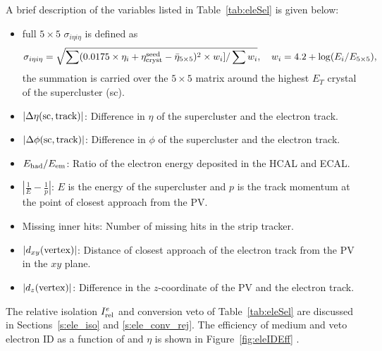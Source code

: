 A brief description of the variables listed in Table~\ref{tab:eleSel} is given below:
\begin{itemize}[leftmargin=*]
    \item full $5\times 5$ $\sigma_{i\eta i\eta}$ is defined as~\cite{Khachatryan:2015hwa} 
    \begin{equation}
    \sigma_{i\eta i\eta}=\sqrt{\sum(0.0175\times\eta_i+\eta^{\rm {seed}}_{\rm {cryst}}-\bar{\eta}_{5\times 5})^2\times w_i]/\sum w_i}, \quad w_i = 4.2 + \log(E_i/E_{5\times 5}),
    \label{eq:sIeIe}
    \end{equation}
    the summation is carried over the $5\times 5$ matrix around the highest $E_T$ crystal of the supercluster (\rm{sc}).
    \item $|\Delta\eta({\rm {sc}},{\rm {track}})|$: Difference in $\eta$ of the supercluster and the electron track.
    \item $|\Delta\phi({\rm {sc}},{\rm {track}})|$: Difference in $\phi$ of the supercluster and the electron track.
    \item $E_{\rm {had}}/E_{\rm {em}}$: Ratio of the electron energy deposited in the HCAL and ECAL.
    \item $|\frac{1}{E}-\frac{1}{p}|$: $E$ is the energy of the supercluster and $p$ is the track momentum at
    the point of closest approach from the PV.
    \item Missing inner hits: Number of missing hits in the strip tracker.
    \item $|d_{xy}({\rm {vertex}})|$: Distance of closest approach of the electron track from the PV in the $xy$ plane.
    \item $|d_{z}({\rm {vertex}})|$: Difference in the $z$-coordinate of the PV and the electron track.
\end{itemize}
The relative isolation $I_{\rm {rel}}^e$ and conversion veto of Table~\ref{tab:eleSel}
are discussed in Sections~\ref{s:ele_iso} and \ref{s:ele_conv_rej}. The efficiency of medium and 
veto electron ID as a function of \pt and $\eta$ is shown in Figure~\ref{fig:eleIDEff} \cite{eleSF}.
